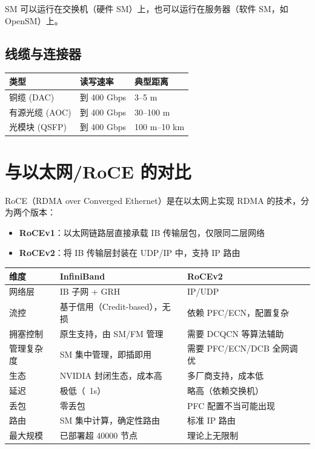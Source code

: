 SM 可以运行在交换机（硬件 SM）上，也可以运行在服务器（软件 SM，如 OpenSM）上。

\subsection{线缆与连接器}

\begin{longtable}{lll}
\toprule
\textbf{类型} & \textbf{读写速率} & \textbf{典型距离} \\
\midrule
\endhead
\bottomrule
\endfoot
铜缆 (DAC)          & 到 400 Gbps  & 3--5 m \\
有源光缆 (AOC)      & 到 400 Gbps  & 30--100 m \\
光模块 (QSFP)       & 到 400 Gbps  & 100 m--10 km \\
\end{longtable}

\section{与以太网/RoCE 的对比}

RoCE（RDMA over Converged Ethernet）是在以太网上实现 RDMA 的技术，分为两个版本：

\begin{itemize}
  \item \textbf{RoCEv1}：以太网链路层直接承载 IB 传输层包，仅限同二层网络
  \item \textbf{RoCEv2}：将 IB 传输层封装在 UDP/IP 中，支持 IP 路由
\end{itemize}

\begin{longtable}{lll}
\toprule
\textbf{维度} & \textbf{InfiniBand} & \textbf{RoCEv2} \\
\midrule
\endhead
\bottomrule
\endfoot
网络层       & IB 子网 + GRH                      & IP/UDP \\
流控         & 基于信用（Credit-based），无损     & 依赖 PFC/ECN，配置复杂 \\
拥塞控制     & 原生支持，由 SM/FM 管理            & 需要 DCQCN 等算法辅助 \\
管理复杂度   & SM 集中管理，即插即用              & 需要 PFC/ECN/DCB 全网调优 \\
生态         & NVIDIA 封闭生态，成本高            & 多厂商支持，成本低 \\
延迟         & 极低（~1\textmu{}s）                 & 略高（依赖交换机） \\
丢包         & 零丢包                             & PFC 配置不当可能出现 \\
路由         & SM 集中计算，确定性路由             & 标准 IP 路由 \\
最大规模     & 已部署超 40000 节点                 & 理论上无限制 \\
\end{longtable}

